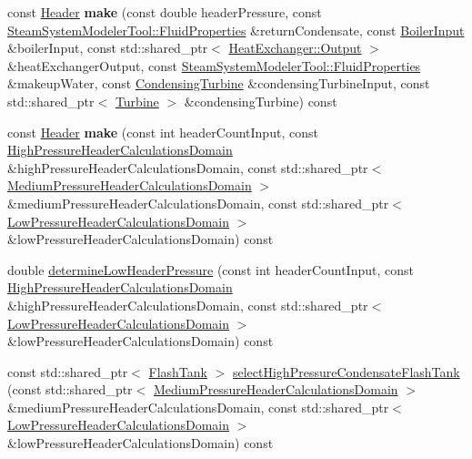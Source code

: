 \begin{DoxyCompactItemize}
\item 
\mbox{\label{class_header_factory_afe118d8149774dbd570bee38352b43b2}} 
const \hyperlink{class_header}{Header} {\bfseries make} (const double header\+Pressure, const \hyperlink{struct_steam_system_modeler_tool_1_1_fluid_properties}{Steam\+System\+Modeler\+Tool\+::\+Fluid\+Properties} \&return\+Condensate, const \hyperlink{class_boiler_input}{Boiler\+Input} \&boiler\+Input, const std\+::shared\+\_\+ptr$<$ \hyperlink{struct_heat_exchanger_1_1_output}{Heat\+Exchanger\+::\+Output} $>$ \&heat\+Exchanger\+Output, const \hyperlink{struct_steam_system_modeler_tool_1_1_fluid_properties}{Steam\+System\+Modeler\+Tool\+::\+Fluid\+Properties} \&makeup\+Water, const \hyperlink{class_condensing_turbine}{Condensing\+Turbine} \&condensing\+Turbine\+Input, const std\+::shared\+\_\+ptr$<$ \hyperlink{class_turbine}{Turbine} $>$ \&condensing\+Turbine) const
\item 
\mbox{\label{class_header_factory_affb7bdf26093f8f662366a312b997d09}} 
const \hyperlink{class_header}{Header} {\bfseries make} (const int header\+Count\+Input, const \hyperlink{class_high_pressure_header_calculations_domain}{High\+Pressure\+Header\+Calculations\+Domain} \&high\+Pressure\+Header\+Calculations\+Domain, const std\+::shared\+\_\+ptr$<$ \hyperlink{class_medium_pressure_header_calculations_domain}{Medium\+Pressure\+Header\+Calculations\+Domain} $>$ \&medium\+Pressure\+Header\+Calculations\+Domain, const std\+::shared\+\_\+ptr$<$ \hyperlink{class_low_pressure_header_calculations_domain}{Low\+Pressure\+Header\+Calculations\+Domain} $>$ \&low\+Pressure\+Header\+Calculations\+Domain) const
\item 
double \hyperlink{class_header_factory_af015658ac803d2fb4248f59847c40338}{determine\+Low\+Header\+Pressure} (const int header\+Count\+Input, const \hyperlink{class_high_pressure_header_calculations_domain}{High\+Pressure\+Header\+Calculations\+Domain} \&high\+Pressure\+Header\+Calculations\+Domain, const std\+::shared\+\_\+ptr$<$ \hyperlink{class_low_pressure_header_calculations_domain}{Low\+Pressure\+Header\+Calculations\+Domain} $>$ \&low\+Pressure\+Header\+Calculations\+Domain) const
\item 
const std\+::shared\+\_\+ptr$<$ \hyperlink{class_flash_tank}{Flash\+Tank} $>$ \hyperlink{class_header_factory_a8e220fb9ed937623e9ca21e27672ec61}{select\+High\+Pressure\+Condensate\+Flash\+Tank} (const std\+::shared\+\_\+ptr$<$ \hyperlink{class_medium_pressure_header_calculations_domain}{Medium\+Pressure\+Header\+Calculations\+Domain} $>$ \&medium\+Pressure\+Header\+Calculations\+Domain, const std\+::shared\+\_\+ptr$<$ \hyperlink{class_low_pressure_header_calculations_domain}{Low\+Pressure\+Header\+Calculations\+Domain} $>$ \&low\+Pressure\+Header\+Calculations\+Domain) const

\end{DoxyCompactItemize}
